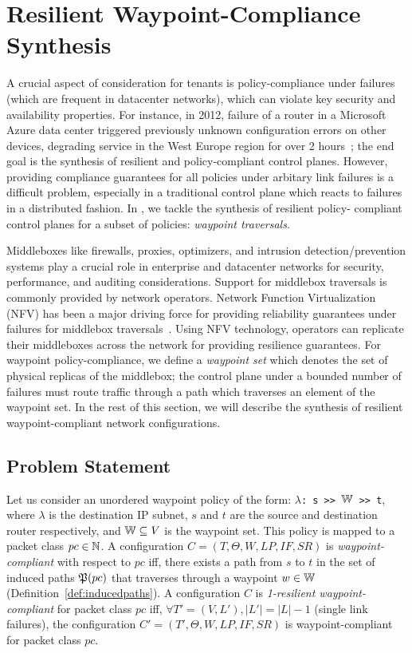 \section{Resilient Waypoint-Compliance Synthesis}
A crucial aspect of consideration for tenants is 
policy-compliance under failures (which are frequent in 
datacenter networks), which can violate key security
and availability properties. 
For instance, in 2012,
failure of a router in a Microsoft Azure data center 
triggered previously unknown configuration errors on other 
devices, degrading service 
in the West Europe region for over 2
hours~\cite{azure}; the end goal is 
the synthesis of resilient and policy-compliant 
control planes. 
However, providing compliance 
guarantees for all policies
under arbitary link failures is a difficult problem, 
especially in a traditional control plane 
which reacts to failures in a distributed fashion. 
In \name, we tackle the synthesis of resilient policy-
compliant control planes for a subset of policies: 
\emph{waypoint traversals}.

Middleboxes like firewalls,
proxies, optimizers, and intrusion detection/prevention 
systems 
 play a crucial role in enterprise and
datacenter networks for security, performance,  
and auditing considerations. Support for  
middlebox traversals is commonly 
provided by network operators.
Network Function Virtualization (NFV) has been a 
major driving force for providing reliability 
guarantees under failures  
for middlebox traversals~\cite{opennf, netbricks}. 
Using NFV technology, operators can replicate 
their middleboxes across the network for providing 
resilience guarantees. For waypoint policy-compliance, 
we define a \emph{waypoint set} 
which denotes the set of physical replicas of the 
middlebox; the control plane under a bounded 
number of failures must route traffic through a 
path which traverses an element of the waypoint
set. In the rest of this section, 
we will describe the synthesis of resilient 
waypoint-compliant network configurations. 

\subsection{Problem Statement}
Let us consider an 
unordered waypoint policy of the form: 
\texttt{$\lambda$: s >> $\mathbb{W}$ >> t},
where $\lambda$ is the destination IP subnet,  
$s$ and $t$ are the source and destination router respectively, 
and $\mathbb{W} \subseteq V$ is the waypoint set. This
policy is mapped to a packet class $pc \in \mathbb{N}$. 
A configuration $C=(T,\Theta,W,LP,IF,SR)$ is 
\emph{waypoint-compliant} with respect to $pc$ 
iff, there exists a path from $s$ to $t$ in the 
set of induced paths $\mathfrak{P}(pc)$ that traverses
through a waypoint $w \in \mathbb{W}$
(Definition~\ref{def:inducedpaths}). 
A configuration $C$ is 
\emph{1-resilient waypoint-compliant} 
for packet class $pc$  
iff,   
$\forall T' = (V, L'), |L'| = |L| - 1$ (single link failures), 
the configuration $C'
=(T',\Theta,W,LP,IF,SR)$  
is waypoint-compliant for packet class $pc$. 


